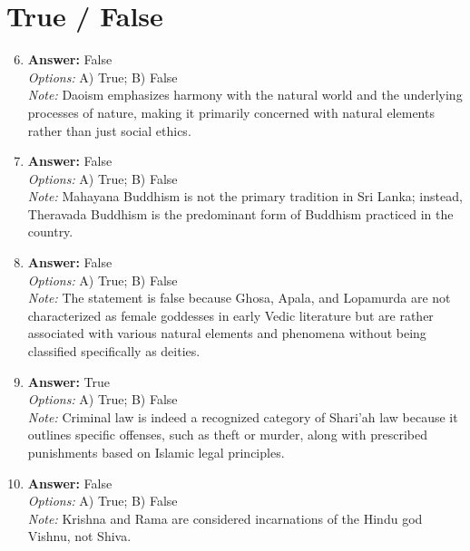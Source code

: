 \documentclass[12pt]{article}
\begin{document}
\section*{True / False}
\begin{enumerate}[label=\arabic*.]
\setcounter{enumi}{5}
\item \textbf{Answer:} False
\\ \textit{Options:} A) True; B) False
\\ \textit{Note:} Daoism emphasizes harmony with the natural world and the underlying processes of nature, making it primarily concerned with natural elements rather than just social ethics.
\item \textbf{Answer:} False
\\ \textit{Options:} A) True; B) False
\\ \textit{Note:} Mahayana Buddhism is not the primary tradition in Sri Lanka; instead, Theravada Buddhism is the predominant form of Buddhism practiced in the country.
\item \textbf{Answer:} False
\\ \textit{Options:} A) True; B) False
\\ \textit{Note:} The statement is false because Ghosa, Apala, and Lopamurda are not characterized as female goddesses in early Vedic literature but are rather associated with various natural elements and phenomena without being classified specifically as deities.
\item \textbf{Answer:} True
\\ \textit{Options:} A) True; B) False
\\ \textit{Note:} Criminal law is indeed a recognized category of Shari'ah law because it outlines specific offenses, such as theft or murder, along with prescribed punishments based on Islamic legal principles.
\item \textbf{Answer:} False
\\ \textit{Options:} A) True; B) False
\\ \textit{Note:} Krishna and Rama are considered incarnations of the Hindu god Vishnu, not Shiva.
\end{enumerate}
\end{document}
